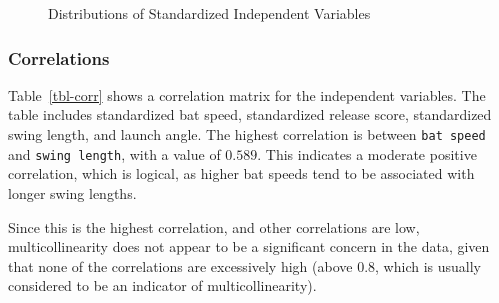 \documentclass[
  letterpaper,
  DIV=11,
  numbers=noendperiod]{scrartcl}
\begin{document}
\begin{figure}[H]


\caption{\label{fig-dists}Distributions of Standardized Independent
Variables}

\end{figure}%

\newpage

\subsubsection{Correlations}\label{correlations}

Table~\ref{tbl-corr} shows a correlation matrix for the independent
variables. The table includes standardized bat speed, standardized
release score, standardized swing length, and launch angle. The highest
correlation is between \texttt{bat\ speed} and \texttt{swing\ length},
with a value of \(0.589\). This indicates a moderate positive
correlation, which is logical, as higher bat speeds tend to be
associated with longer swing lengths.

Since this is the highest correlation, and other correlations are low,
multicollinearity does not appear to be a significant concern in the
data, given that none of the correlations are excessively high (above
0.8, which is usually considered to be an indicator of
multicollinearity).
\end{document}
